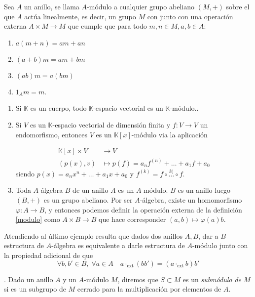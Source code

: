 \documentclass[../main.tex]{subfiles}
\begin{document}
\begin {definition} \label{modulo}
Sea $A$ un anillo, se llama $A$-módulo a cualquier grupo abeliano $(M,+)$ sobre el que $A$ actúa linealmente, es decir, un grupo $M$ con junto con una operación externa $A\times M \to M$ que cumple que para todo $m,n \in M, a,b \in A$:
\begin{enumerate}
  \item $a(m+n) = am + an$
  \item $(a+b)m = am+bm$
  \item $(ab)m = a(bm)$
  \item $1_Am = m$.
\end{enumerate}
\end{definition}

\begin{example}
\begin{enumerate}
  \item Si $\mathbb K $ es un cuerpo, todo $\mathbb K$-espacio vectorial es un $\mathbb K$-módulo..
  \item Si $V$ es un $\mathbb K$-espacio vectorial de dimensión finita y $f:V\to V$ un endomorfismo, entonces $V$ es un $\mathbb K[x]$-módulo via la aplicación

  \begin{align*}
    {\mathbb K[x]\times V} & \to     V                                 \\
    {(p(x),v)}             & \mapsto p(f) = a_nf^{(n)}+\dots+a_1 f+a_0
  \end{align*}
  siendo $p(x) = a_nx^n+\dots+a_1x + a_0$ y $f^(k) = f\circ \overset{k)}{\dots} \circ f$.
  \item Toda $A$-álgebra $B$ de un anillo $A$ es un $A$-módulo. $B$ es un anillo luego $(B,+)$ es un grupo abeliano. Por ser $A$-álgebra, existe un homomorfismo $\varphi:A\to B$, y entonces podemos definir la operación externa de la definición \ref{modulo} como $A\times B \to B$ que hace corresponder $(a,b) \mapsto\varphi(a)b$.
\end{enumerate}
\end{example}

\begin{remark} \label{prop_adicional}
Atendiendo al último ejemplo resulta que dados dos anillos $A, B$, dar a $B$ estructura de $A$-álgebra es equivalente a darle estructura de $A$-módulo junto con la propiedad adicional de que
\[\forall b, b' \in B, \; \forall a \in  A \quad a \cdot_{\text{ext}} (bb') = (a\cdot_{\text{ext}} b) b'\]
\end{remark}
\begin{definition}. Dado un anillo $A$ y un $A$-módulo $M$, diremos que $S\subset M$ es un \textit{submódulo de $M$} si es un subgrupo de $M$ cerrado para la multiplicación por elementos de $A$.
\end{definition}
\end{document}
